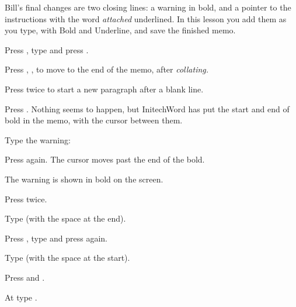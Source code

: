 Bill's final changes are two closing lines: a warning in bold, and a
pointer to the instructions with the word \textit{attached} underlined.  In
this lesson you add them as you type, with Bold and Underline, and save the
finished memo.

\begin{WPSteps}
\item Press , type  and press
.
\item Press , ,  to move to the
end of the memo, after \textit{collating.}
\end{WPSteps}

\begin{WPSteps}
\item Press  twice to start a new paragraph after a blank
line.
\item Press .  Nothing seems to happen, but InitechWord has
put the start and end of bold in the memo, with the cursor between them.
\item Type the warning:
\item Press  again.  The cursor moves past the end of the
bold.
\end{WPSteps}
The warning is shown in bold on the screen.

\begin{WPSteps}
\item Press  twice.
\item Type  (with the space at the end).
\item Press , type  and press
 again.
\item Type  (with the space at the
start).
\end{WPSteps}

\begin{WPSteps}
\item Press  and .
\item At  type .
\end{WPSteps}

